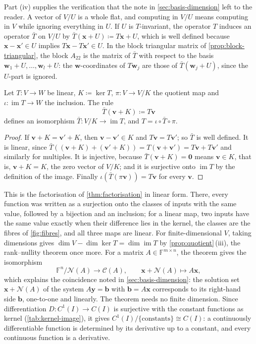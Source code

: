 Part (iv) supplies the verification that the note in \cref{sec:basis-dimension} left to the reader. A vector of $V/U$ is a whole flat, and computing in $V/U$ means computing in $V$ while ignoring everything in $U$. If $U$ is $T$-invariant, the operator $T$ induces an operator $\bar T$ on $V/U$ by $\bar T(\mathbf x+U)\coloneqq T\mathbf x+U$, which is well defined because $\mathbf x-\mathbf x'\in U$ implies $T\mathbf x-T\mathbf x'\in U$. In the block triangular matrix of \cref{prop:block-triangular}, the block $A_{22}$ is the matrix of $\bar T$ with respect to the basis $\mathbf w_1+U,\ldots,\mathbf w_l+U$: the $\mathbf w$-coordinates of $T\mathbf w_j$ are those of $\bar T(\mathbf w_j+U)$, since the $U$-part is ignored.

\begin{theorem}
\label{thm:first-isomorphism}
Let $T\colon V\to W$ be linear, $K\coloneqq\ker T$, $\pi\colon V\to V/K$ the quotient map and $\iota\colon\operatorname{im}T\to W$ the inclusion. The rule
\[
\bar T(\mathbf v+K)\coloneqq T\mathbf v
\]
defines an isomorphism $\bar T\colon V/K\to\operatorname{im}T$, and $T=\iota\circ\bar T\circ\pi$.
\end{theorem}

\begin{proof}
If $\mathbf v+K=\mathbf v'+K$, then $\mathbf v-\mathbf v'\in K$ and $T\mathbf v=T\mathbf v'$; so $\bar T$ is well defined. It is linear, since $\bar T((\mathbf v+K)+(\mathbf v'+K))=T(\mathbf v+\mathbf v')=T\mathbf v+T\mathbf v'$ and similarly for multiples. It is injective, because $\bar T(\mathbf v+K)=\mathbf 0$ means $\mathbf v\in K$, that is, $\mathbf v+K=K$, the zero vector of $V/K$; and it is surjective onto $\operatorname{im}T$ by the definition of the image. Finally $\iota(\bar T(\pi\mathbf v))=T\mathbf v$ for every $\mathbf v$.
\end{proof}

This is the factorisation of \cref{thm:factorisation} in linear form. There, every function was written as a surjection onto the classes of inputs with the same value, followed by a bijection and an inclusion; for a linear map, two inputs have the same value exactly when their difference lies in the kernel, the classes are the fibres of \cref{fig:fibres}, and all three maps are linear. For finite-dimensional $V$, taking dimensions gives $\dim V-\dim\ker T=\dim\operatorname{im}T$ by \cref{prop:quotient}\,(iii), the rank--nullity theorem once more. For a matrix $A\in\mathbb F^{m\times n}$, the theorem gives the isomorphism
\[
\mathbb F^n/\mathcal N(A)\to\mathcal C(A),\qquad\mathbf x+\mathcal N(A)\mapsto A\mathbf x,
\]
which explains the coincidence noted in \cref{sec:basis-dimension}: the solution set $\mathbf x+\mathcal N(A)$ of the system $A\mathbf y=\mathbf b$ with $\mathbf b=A\mathbf x$ corresponds to its right-hand side $\mathbf b$, one-to-one and linearly. The theorem needs no finite dimension. Since differentiation $D\colon C^1(I)\to C(I)$ is surjective with the constant functions as kernel (\cref{tab:kernel-image}), it gives $C^1(I)/\{\text{constants}\}\cong C(I)$: a continuously differentiable function is determined by its derivative up to a constant, and every continuous function is a derivative.

